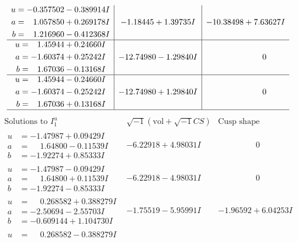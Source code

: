 \documentclass[1p]{elsarticle_modified}
\theoremstyle{definition}
\newcommand{\I}{\sqrt{-1}}
\begin{document}
$$\begin{array}{c|c|c}
\begin{aligned}
u &= -0.357502 - 0.389914 I \\
a &= \phantom{-}1.057850 + 0.269178 I \\
b &= \phantom{-}1.216960 - 0.412368 I\end{aligned}
 & -1.18445 + 1.39735 I & -10.38498 + 7.63627 I \\ \hline\begin{aligned}
u &= \phantom{-}1.45944 + 0.24660 I \\
a &= -1.60374 + 0.25242 I \\
b &= \phantom{-}1.67036 - 0.13168 I\end{aligned}
 & -12.74980 - 1.29840 I & \phantom{-0.000000 } 0 \\ \hline\begin{aligned}
u &= \phantom{-}1.45944 - 0.24660 I \\
a &= -1.60374 - 0.25242 I \\
b &= \phantom{-}1.67036 + 0.13168 I\end{aligned}
 & -12.74980 + 1.29840 I & \phantom{-0.000000 } 0\\
 \hline 
 \end{array}$$\newpage$$\begin{array}{c|c|c}  
\text{Solutions to }I^u_{1}& \I (\text{vol} + \sqrt{-1}CS) & \text{Cusp shape}\\
 \hline 
\begin{aligned}
u &= -1.47987 + 0.09429 I \\
a &= \phantom{-}1.64800 - 0.11539 I \\
b &= -1.92274 + 0.85333 I\end{aligned}
 & -6.22918 + 4.98031 I & \phantom{-0.000000 } 0 \\ \hline\begin{aligned}
u &= -1.47987 - 0.09429 I \\
a &= \phantom{-}1.64800 + 0.11539 I \\
b &= -1.92274 - 0.85333 I\end{aligned}
 & -6.22918 - 4.98031 I & \phantom{-0.000000 } 0 \\ \hline\begin{aligned}
u &= \phantom{-}0.268582 + 0.388279 I \\
a &= -2.50694 - 2.55703 I \\
b &= -0.609144 + 1.104730 I\end{aligned}
 & -1.75519 - 5.95991 I & -1.96592 + 6.04253 I \\ \hline\begin{aligned}
u &= \phantom{-}0.268582 - 0.388279 I \\

\end{aligned}
\end{array}$$
\end{document}
